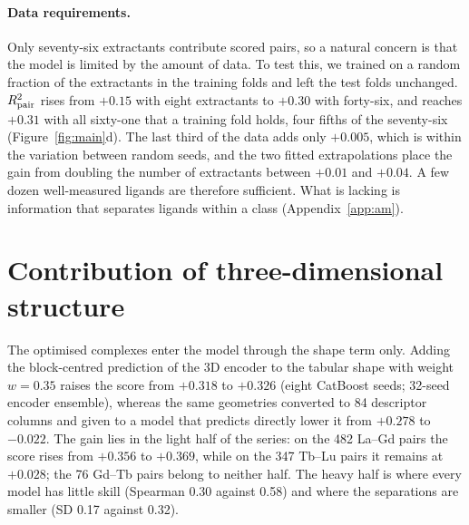 \paragraph{Data requirements.}
Only seventy-six extractants contribute scored pairs, so a natural concern is that the model is limited by the amount of data. To test this, we trained on a random fraction of the extractants in the training folds and left the test folds unchanged. $R^2_{\mathrm{pair}}$ rises from $+0.15$ with eight extractants to $+0.30$ with forty-six, and reaches $+0.31$ with all sixty-one that a training fold holds, four fifths of the seventy-six (Figure~\ref{fig:main}d). The last third of the data adds only $+0.005$, which is within the variation between random seeds, and the two fitted extrapolations place the gain from doubling the number of extractants between $+0.01$ and $+0.04$. A few dozen well-measured ligands are therefore sufficient. What is lacking is information that separates ligands within a class (Appendix~\ref{app:am}).

\section{Contribution of three-dimensional structure}
\label{sec:geom}
The optimised complexes enter the model through the shape term only. Adding the block-centred prediction of the 3D encoder to the tabular shape with weight $w = 0.35$ raises the score from $+0.318$ to $+0.326$ (eight CatBoost seeds; 32-seed encoder ensemble), whereas the same geometries converted to 84 descriptor columns and given to a model that predicts \logD{} directly lower it from $+0.278$ to $-0.022$. The gain lies in the light half of the series: on the 482 La--Gd pairs the score rises from $+0.356$ to $+0.369$, while on the 347 Tb--Lu pairs it remains at $+0.028$; the 76 Gd--Tb pairs belong to neither half. The heavy half is where every model has little skill (Spearman 0.30 against 0.58) and where the separations are smaller (SD 0.17 against 0.32).

